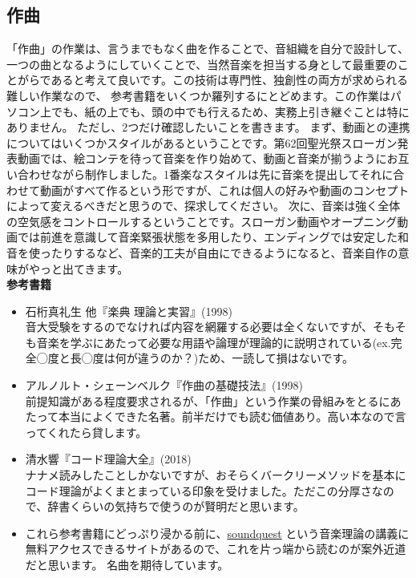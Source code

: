 \documentclass[dvipdfmx,jb5]{jarticle}
\newcommand{\link}[2]{\href{#2}{#1}}
\begin{document}
\subsection{作曲}
「作曲」の作業は、言うまでもなく曲を作ることで、音組織を自分で設計して、一つの曲となるようにしていくことで、当然音楽を担当する身として最重要のことがらであると考えて良いです。この技術は専門性、独創性の両方が求められる難しい作業なので、 参考書籍をいくつか羅列するにとどめます。この作業はパソコン上でも、紙の上でも、頭の中でも行えるため、実務上引き継ぐことは特にありません。
ただし、2つだけ確認したいことを書きます。
まず、動画との連携についてはいくつかスタイルがあるということです。第62回聖光祭スローガン発表動画では、絵コンテを待って音楽を作り始めて、動画と音楽が揃うようにお互い合わせながら制作しました。1番楽なスタイルは先に音楽を提出してそれに合わせて動画がすべて作るという形ですが、これは個人の好みや動画のコンセプトによって変えるべきだと思うので、探求してください。
次に、音楽は強く全体の空気感をコントロールするということです。スローガン動画やオープニング動画では前進を意識して音楽緊張状態を多用したり、エンディングでは安定した和音を使ったりするなど、音楽的工夫が自由にできるようになると、音楽自作の意味がやっと出てきます。\\

{\bf 参考書籍}
\begin{itemize}
  \item 石桁真礼生 他『楽典 理論と実習』(1998)\\音大受験をするのでなければ内容を網羅する必要は全くないですが、そもそも音楽を学ぶにあたって必要な用語や論理が理論的に説明されている(ex.完全◯度と長◯度は何が違うのか？)ため、一読して損はないです。
  \item アルノルト・シェーンベルク『作曲の基礎技法』(1998)\\前提知識がある程度要求されるが、「作曲」という作業の骨組みをとるにあたって本当によくできた名著。前半だけでも読む価値あり。高い本なので言ってくれたら貸します。
  \item 清水響『コード理論大全』(2018)\\ナナメ読みしたことしかないですが、おそらくバークリーメソッドを基本にコード理論がよくまとまっている印象を受けました。ただこの分厚さなので、辞書くらいの気持ちで使うのが賢明だと思います。
  \item これら参考書籍にどっぷり浸かる前に、\link{soundquest}{https://soundquest.jp/category-archive-chord/}
  という音楽理論の講義に無料アクセスできるサイトがあるので、これを片っ端から読むのが案外近道だと思います。
  名曲を期待しています。
\end{itemize}
\end{document}
